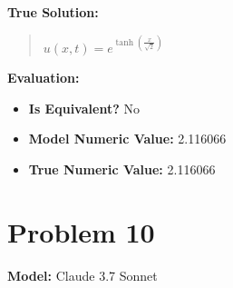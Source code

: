 \documentclass{article}
\begin{document}
\textbf{True Solution:}
\begin{quote}
$u(x,t) = e^{\tanh\left(\frac{x}{\sqrt{2}}\right)}$
\end{quote}

\textbf{Evaluation:}
\begin{itemize}
\item \textbf{Is Equivalent?} No
\item \textbf{Model Numeric Value:} 2.116066
\item \textbf{True Numeric Value:} 2.116066
\end{itemize}
\vspace{1cm}
\section*{Problem 10}
\textbf{Model:} Claude 3.7 Sonnet
\end{document}
